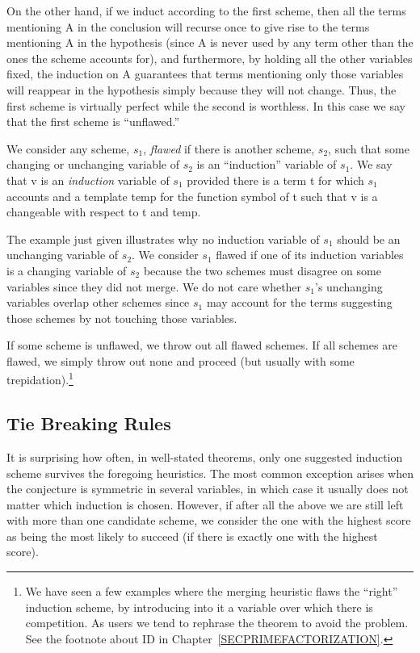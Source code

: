 \documentclass[11pt]{book}
\newcommand{\pubinlineunderline}[1]{\emph{#1}}
\newcommand{\pubdefaulttextsize}{\large}
\begin{document}
On the other hand, if we induct according to the first scheme,
then all the terms mentioning A in the conclusion
will recurse once to give rise to the terms mentioning A in the hypothesis
(since A is never used by any term other than the ones the scheme
accounts for), and furthermore, by holding all the other variables
fixed, the induction on A guarantees that terms mentioning only those
variables will reappear in the hypothesis simply because they will not
change.  Thus, the first scheme is virtually perfect while the
second is worthless.  In this case we say that the first scheme is ``unflawed.''

We consider any scheme, $s_{1}$, \pubinlineunderline{flawed} if there is another scheme, $s_{2}$,
such that some changing or unchanging variable of $s_{2}$ is an ``induction''
variable of $s_{1}$.  We say that v is an \pubinlineunderline{induction} variable of $s_{1}$
provided there is a term t for which $s_{1}$ accounts and a template temp
for the function symbol of t such that v is a changeable with respect to
t and temp.

The example
just given illustrates why no induction variable of $s_{1}$ should be an unchanging
variable of $s_{2}$.   We consider $s_{1}$ flawed if one of its induction
variables is a changing variable
of $s_{2}$ because the two schemes must disagree on some variables since they
did not merge.  We do not care whether $s_{1}$'s unchanging variables
overlap other schemes since $s_{1}$ may account for the terms suggesting those schemes
by not touching those variables.

If some scheme is unflawed, we throw out all flawed schemes.  If all
schemes are flawed, we simply throw out none
and proceed (but usually with some trepidation).\footnote{We have seen a few examples where the merging heuristic flaws the ``right'' induction scheme, by introducing into it a variable over which there is competition.  As users we tend to rephrase the theorem to avoid the problem. See the footnote about ID in Chapter~\ref{SECPRIMEFACTORIZATION}.}
\subsection{Tie Breaking Rules}
\pubdefaulttextsize
It is surprising how often, in well-stated theorems, only one
suggested induction scheme survives the foregoing heuristics.
The most common exception arises  when the conjecture is symmetric in several
variables, in which case it usually does not matter which induction
is chosen.  However, if after all the above we are still left
with more than one candidate scheme, we consider the one with the
highest score as being the most likely to succeed (if there is exactly
one with the highest score).
\end{document}
